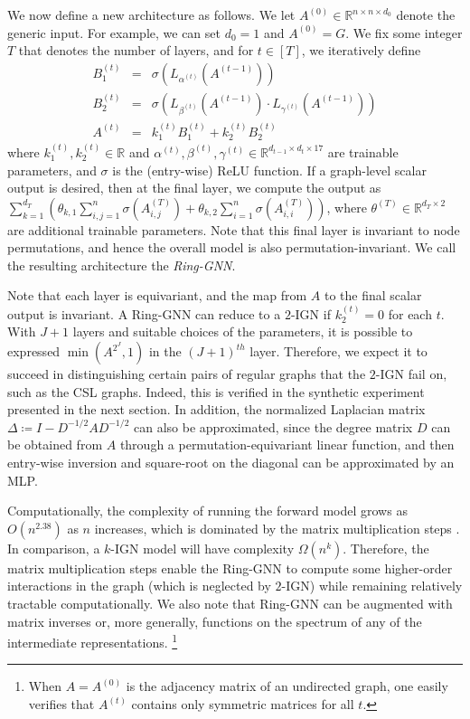 \documentclass{article}
\begin{document}
We now define a new architecture as follows. We let $A^{(0)} \in \mathbb R^{n\times n\times d_0}$ denote the generic input. For example, we can set $d_0=1$ and $A^{(0)} = G$. We fix some integer $T$ that denotes the number of layers, and for $t \in [T]$, we iteratively define
\begin{eqnarray*}
B_1^{(t)}&=& \sigma(L_{\alpha^{(t)}}(A^{(t-1)})) \\
B_2^{(t)}&=& \sigma(L_{\beta^{(t)}}(A^{(t-1)})\cdot L_{\gamma^{(t)}}(A^{(t-1)})) \\
A^{(t)}&=& k_1^{(t)} B_1^{(t)} + k_2^{(t)} B_2^{(t)}
\end{eqnarray*}
where $k_1^{(t)}, k_2^{(t)} \in \mathbb{R}$ and $\alpha^{(t)}, \beta^{(t)}, \gamma^{(t)} \in \mathbb{ R}^{d_{t-1} \times d_{t} \times 17}$ are trainable parameters, and $\sigma$ is the (entry-wise) ReLU function. 
If a graph-level scalar output is desired, then at the final layer, we compute the output as $\sum_{k=1}^{d_T} ( \theta_{k, 1} \sum_{i,j=1}^n \sigma(A_{i,j}^{(T)}) + \theta_{k, 2} \sum_{i=1}^n \sigma( A_{i,i}^{(T)} ) )$, where $\theta^{(T)} \in \mathbb{R}^{d_T \times 2}$ are additional trainable parameters. Note that this final layer is invariant to node permutations, and hence the overall model is also permutation-invariant. We call the resulting architecture the \textit{Ring-GNN}.

Note that each layer is equivariant, and the map from $A$ to the final scalar output is invariant. A Ring-GNN can reduce to a $2$-IGN if $k_2^{(t)} = 0$ for each $t$. With $J+1$ layers and suitable choices of the parameters, it is possible to expressed $\min(A^{2^{J}}, 1)$ in the $(J+1)^{th}$ layer. Therefore, we expect it to succeed in distinguishing certain pairs of regular graphs that the $2$-IGN fail on, such as the CSL graphs. Indeed, this is verified in the synthetic experiment presented in the next section. In addition, the normalized Laplacian matrix $\Delta \coloneqq I - D^{-1/2} A D^{-1/2}$ can also be approximated, since the degree matrix $D$ can be obtained from $A$ through a permutation-equivariant linear function, and then entry-wise inversion and square-root on the diagonal can be approximated by an MLP.

Computationally, the complexity of running the forward model grows as $O(n^{2.38})$ as $n$ increases, which is dominated by the matrix multiplication steps \cite{coppersmith1987arithmetic}.
In comparison, a $k$-IGN model will have complexity $\Omega(n^k)$. Therefore, the matrix multiplication steps enable the Ring-GNN to compute some higher-order interactions in the graph (which is neglected by $2$-IGN) while remaining relatively tractable computationally.
We also note that Ring-GNN can be augmented with matrix inverses or, more generally, functions on the spectrum of any of the intermediate representations. \footnote{When $A=A^{(0)}$ is the adjacency matrix of an undirected graph, one easily verifies that $A^{(t)}$ contains only symmetric matrices for all $t$.} 
\end{document}
